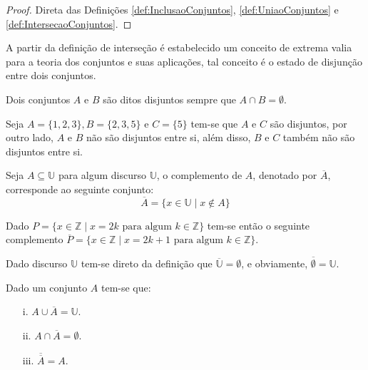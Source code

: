 \begin{proof}
	Direta das Definições \ref{def:InclusaoConjuntos}, \ref{def:UniaoConjuntos} e \ref{def:IntersecaoConjuntos}.
\end{proof}

A partir da definição de interseção é estabelecido um conceito de extrema valia para a teoria dos conjuntos e suas aplicações, tal conceito é o estado de disjunção entre dois conjuntos.

\begin{definicao}\label{def:ConjuntosDisjuntos}
	Dois conjuntos $A$ e $B$ são ditos disjuntos sempre que $A \cap B = \emptyset$.
\end{definicao}

\begin{exemplo}\label{exe:ConjuntosDisjuntos}
	Seja $A = \{1, 2, 3\}, B = \{2, 3, 5\}$ e $C = \{5\}$ tem-se que $A$ e $C$ são disjuntos, por outro lado, $A$ e $B$ não são disjuntos entre si, além disso, $B$ e $C$ também não são disjuntos entre si.
\end{exemplo}

\begin{definicao}\label{def:ComplementoConjuntos}
	Seja $A \subseteq \mathbb{U}$ para algum discurso $\mathbb{U}$, o complemento de $A$, denotado por $\overline{A}$, corresponde ao seguinte conjunto:
	$$\overline{A} = \{x \in \mathbb{U} \mid x \notin A\}$$
\end{definicao}

\begin{exemplo}\label{exe:ComplementoConjuntos1}
	Dado $P = \{ x \in \mathbb{Z} \mid x = 2k \mbox{ para algum } k \in \mathbb{Z}\}$ tem-se então o seguinte complemento $\overline{P} = \{ x \in \mathbb{Z} \mid x = 2k + 1 \mbox{ para algum } k \in \mathbb{Z}\}$.
\end{exemplo}

\begin{exemplo}\label{exe:ComplementoConjuntos2}
  Dado discurso $\mathbb{U}$ tem-se direto da definição que $\overline{\mathbb{U}} = \emptyset$, e obviamente, $\overline{\emptyset} = \mathbb{U}$.
\end{exemplo}

\begin{teorema}\label{teo:PropriedadesComplemento}
	Dado um conjunto $A$ tem-se que:
	\begin{itemize}
		\item[i.] $A \cup \overline{A} = \mathbb{U}$.
		\item[ii.] $A \cap \overline{A} = \emptyset$.
		\item[iii.] $\overline{\overline{A}} = A$.
	\end{itemize}
\end{teorema}

